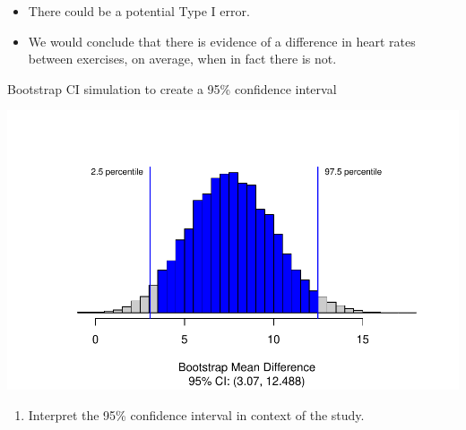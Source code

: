 \documentclass[
]{report}
\newenvironment{Shaded}{\begin{snugshade}}{\end{snugshade}}
\newcommand{\AttributeTok}[1]{\textcolor[rgb]{0.13,0.29,0.53}{#1}}
\newcommand{\CommentTok}[1]{\textcolor[rgb]{0.56,0.35,0.01}{\textit{#1}}}
\newcommand{\DecValTok}[1]{\textcolor[rgb]{0.00,0.00,0.81}{#1}}
\newcommand{\FloatTok}[1]{\textcolor[rgb]{0.00,0.00,0.81}{#1}}
\newcommand{\FunctionTok}[1]{\textcolor[rgb]{0.13,0.29,0.53}{\textbf{#1}}}
\newcommand{\NormalTok}[1]{#1}
\newcommand{\SpecialCharTok}[1]{\textcolor[rgb]{0.81,0.36,0.00}{\textbf{#1}}}
\providecommand{\tightlist}{%
  \setlength{\itemsep}{0pt}\setlength{\parskip}{0pt}}
\begin{document}
\begin{itemize}
\tightlist
\item
  There could be a potential Type I error.
\end{itemize}

\vspace{0.5in}

\begin{itemize}
\tightlist
\item
  We would conclude that there is evidence of a difference in heart rates between exercises, on average, when in fact there is not.
\end{itemize}

\vspace{0.5in}

Bootstrap CI simulation to create a 95\% confidence interval

\begin{Shaded}
\end{Shaded}

\begin{center}\includegraphics[width=0.7\linewidth]{14-UR-module11_review_files/figure-latex/unnamed-chunk-4-1} \end{center}

\begin{enumerate}
\def\labelenumi{\arabic{enumi}.}
\setcounter{enumi}{9}
\tightlist
\item
  Interpret the 95\% confidence interval in context of the study.
\end{enumerate}
\end{document}

